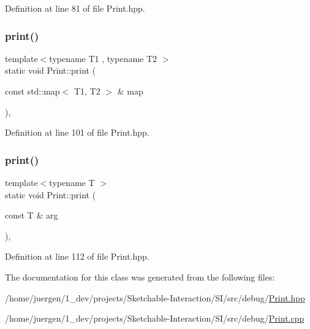Definition at line 81 of file Print.\+hpp.

\mbox{\label{class_print_a05c6cdd69d5464717dd309970a137dc9}} 
\subsubsection{\texorpdfstring{print()}{print()}\hspace{0.1cm}{\footnotesize\ttfamily [3/4]}}
{\footnotesize\ttfamily template$<$typename T1 , typename T2 $>$ \\
static void Print\+::print (\begin{DoxyParamCaption}\item[{const std\+::map$<$ T1, T2 $>$ \&}]{map }\end{DoxyParamCaption})\hspace{0.3cm}{\ttfamily [inline]}, {\ttfamily [static]}}



Definition at line 101 of file Print.\+hpp.

\mbox{\label{class_print_ad4e13f34dafb98c6c3591a45c620181a}} 
\subsubsection{\texorpdfstring{print()}{print()}\hspace{0.1cm}{\footnotesize\ttfamily [4/4]}}
{\footnotesize\ttfamily template$<$typename T $>$ \\
static void Print\+::print (\begin{DoxyParamCaption}\item[{const T \&}]{arg }\end{DoxyParamCaption})\hspace{0.3cm}{\ttfamily [inline]}, {\ttfamily [static]}}



Definition at line 112 of file Print.\+hpp.



The documentation for this class was generated from the following files\+:\begin{DoxyCompactItemize}
\item 
/home/juergen/1\+\_\+dev/projects/\+Sketchable-\/\+Interaction/\+S\+I/src/debug/\mbox{\hyperlink{_print_8hpp}{Print.\+hpp}}\item 
/home/juergen/1\+\_\+dev/projects/\+Sketchable-\/\+Interaction/\+S\+I/src/debug/\mbox{\hyperlink{_print_8cpp}{Print.\+cpp}}\end{DoxyCompactItemize}
